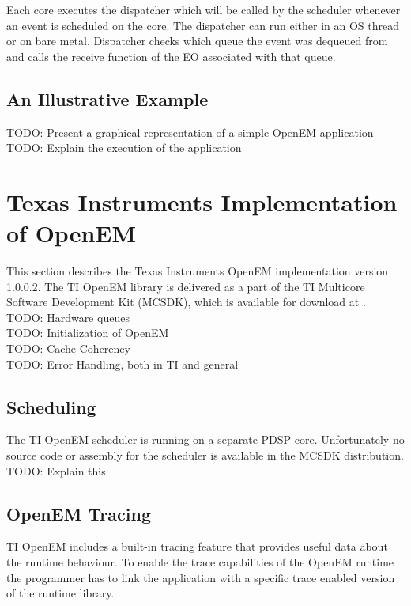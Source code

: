 Each core executes the dispatcher which will be called by the scheduler
whenever an event is scheduled on the core. The dispatcher can run either in an
OS thread or on bare metal. Dispatcher checks which queue the event was
dequeued from and calls the receive function of the EO associated with that
queue. \cite{openemintro}

\subsection{An Illustrative Example}
\label{subsec:example}
TODO: Present a graphical representation of a simple OpenEM application\\
TODO: Explain the execution of the application

\section[Texas Instruments Implementation of OpenEM]{Texas Instruments Implementation \\ of OpenEM}
\label{sec:tiopenem}
This section describes the Texas Instruments OpenEM implementation version
1.0.0.2. The TI OpenEM library is delivered as a part of the TI Multicore
Software Development Kit (MCSDK), which is available for download at
\cite{mcsdkdown}.\\
TODO: Hardware queues\\
TODO: Initialization of OpenEM\\
TODO: Cache Coherency\\
TODO: Error Handling, both in TI and general

\subsection{Scheduling}
The TI OpenEM scheduler is running on a separate PDSP core. Unfortunately no
source code or assembly for the scheduler is available in the MCSDK distribution.\\
TODO: Explain this

\subsection{OpenEM Tracing}
TI OpenEM includes a built-in tracing feature that provides useful data about
the runtime behaviour. To enable the trace capabilities of the OpenEM runtime the
programmer has to link the application with a specific trace enabled version of
the runtime library. \cite{openemapi}

